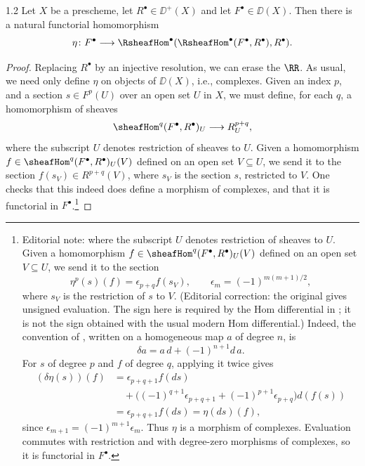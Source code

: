 \begin{booklemma}{1.2}\label{lem:5.1.2}
Let $X$ be a prescheme, let $R^\bullet\in\DD^+(X)$ and let $F^\bullet\in\DD(X)$. Then there is a natural functorial homomorphism
\[
\eta\colon F^\bullet\longrightarrow \RsheafHom^\bullet(\RsheafHom^\bullet(F^\bullet,R^\bullet),R^\bullet).
\]
\end{booklemma}

\begin{proof}
Replacing $R^\bullet$ by an injective resolution, we can erase the $\RR$. As usual, we need only define $\eta$ on objects of $\DD(X)$, i.e., complexes. Given an index $p$, and a section $s\in F^{p}(U)$ over an open set $U$ in $X$, we must define, for each $q$, a homomorphism of sheaves
\[
\sheafHom^{q}(F^\bullet,R^\bullet)_U\longrightarrow R_U^{p+q},
\]
where the subscript $U$ denotes restriction of sheaves to $U$. Given a homomorphism $f\in\sheafHom^{q}(F^\bullet,R^\bullet)_U(V)$ defined on an open set $V\subseteq U$, we send it to the section $f(s_V)\in R^{p+q}(V)$, where $s_V$ is the section $s$, restricted to $V$. One checks that this indeed does define a morphism of complexes, and that it is functorial in $F^\bullet$.\footnote{Editorial note: where the subscript $U$ denotes restriction of sheaves to $U$. Given a homomorphism $f\in\sheafHom^{q}(F^\bullet,R^\bullet)_U(V)$ defined on an open set $V\subseteq U$, we send it to the section
\[
\eta^p(s)(f)=\epsilon_{p+q}f(s_V),
\qquad \epsilon_m=(-1)^{m(m+1)/2},
\]
where $s_V$ is the restriction of $s$ to $V$. (Editorial correction: the original gives unsigned evaluation. The sign here is required by the Hom differential in ; it is not the sign obtained with the usual modern Hom differential.)
Indeed, the convention of , written on a homogeneous map $a$ of degree $n$, is
\[
\delta a=a\,d+(-1)^{n+1}d\,a.
\]
For $s$ of degree $p$ and $f$ of degree $q$, applying it twice gives
\begin{align*}
(\delta\eta(s))(f)
 &=\epsilon_{p+q+1}f(ds) \\
 &\quad+\bigl((-1)^{q+1}\epsilon_{p+q+1}
              +(-1)^{p+1}\epsilon_{p+q}\bigr)d(f(s)) \\
 &=\epsilon_{p+q+1}f(ds)=\eta(ds)(f),
\end{align*}
since $\epsilon_{m+1}=(-1)^{m+1}\epsilon_m$. Thus $\eta$ is a morphism of complexes. Evaluation commutes with restriction and with degree-zero morphisms of complexes, so it is functorial in $F^\bullet$.}

\end{proof}

